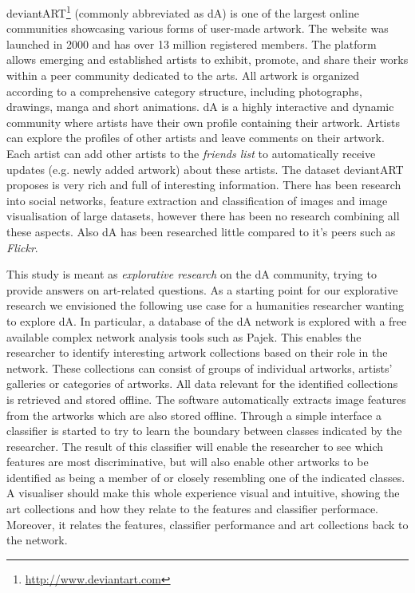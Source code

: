deviantART\footnote{\url{http://www.deviantart.com}} (commonly abbreviated as dA) is one of the largest online communities showcasing various forms of user-made artwork.
The website was launched in 2000 and has over 13 million registered members.
The platform allows emerging and established artists to exhibit, promote, and share their works within a peer community dedicated to the arts. 
All artwork is organized according to a comprehensive category structure, including photographs, drawings, manga and short animations.
dA is a highly interactive and dynamic community where artists have their own profile containing their artwork.
Artists can explore the profiles of other artists and leave comments on their artwork.
Each artist can add other artists to the \textit{friends list} to automatically receive updates (e.g. newly added artwork) about these artists.
The dataset deviantART proposes is very rich and full of interesting information. There has been research into social networks, feature extraction and classification of images and image visualisation of large datasets, however there has been no research combining all these aspects. Also dA has been researched little compared to it's peers such as \textit{Flickr}.

This study is meant as \textit{explorative research} on the dA community, trying to provide answers on art-related questions.
As a starting point for our explorative research we envisioned the following use case for a humanities researcher wanting to explore dA. In particular, a database of the dA network is explored with a free available complex network analysis tools such as Pajek. This enables the researcher to identify interesting artwork collections based on their role in the network. These collections can consist of groups of individual artworks, artists' galleries or categories of artworks.  All data relevant for the identified collections is retrieved and stored offline. The software automatically extracts image features from the artworks which are also stored offline. Through a simple interface a classifier is started to try to learn the boundary between classes indicated by the researcher. The result of this classifier will enable the researcher to see which features are most discriminative, but will also enable other artworks to be identified as being a member of or closely resembling one of the indicated classes. A visualiser should make this whole experience visual and intuitive, showing the art collections and how they relate to the features and classifier performace. Moreover, it relates the features, classifier performance and art collections back to the network.

